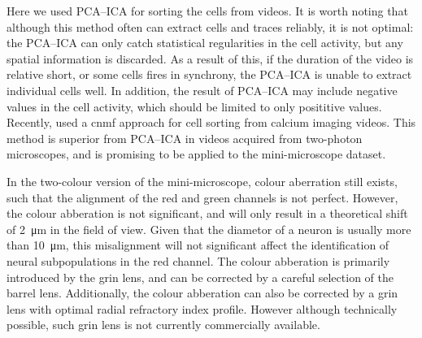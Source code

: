 Here we used PCA--ICA for sorting the cells from videos. It is worth noting that although this method often can extract cells and traces reliably, it is not optimal: the PCA--ICA can only catch statistical regularities in the cell activity, but any spatial information is discarded. As a result of this, if the duration of the video is relative short, or some cells fires in synchrony, the PCA--ICA is unable to extract individual cells well. In addition, the result of PCA--ICA may include negative values in the cell activity, which should be limited to only posititive values. Recently, \citet{pnevmatikakis16} used a \gls{cnmf} approach for cell sorting from calcium imaging videos. This method is superior from PCA--ICA in videos acquired from two-photon microscopes, and is promising to be applied to the mini-microscope dataset. 

In the two-colour version of the mini-microscope, colour aberration still exists, such that the alignment of the red and green channels is not perfect. However, the colour abberation is not significant, and will only result in a theoretical shift of \SI{2}{\um} in the field of view. Given that the diametor of a neuron is usually more than \SI{10}{\um}, this misalignment will not significant affect the identification of neural subpopulations in the red channel. The colour abberation is primarily introduced by the \gls{grin} lens, and can be corrected by a careful selection of the barrel lens. Additionally, the colour abberation can also be corrected by a \gls{grin} lens with optimal radial refractory index profile. However although technically possible, such \gls{grin} lens is not currently commercially available. 




